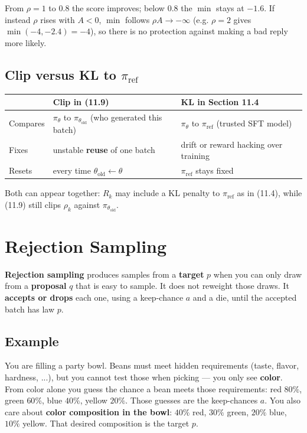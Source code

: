 From $\rho=1$ to $0.8$ the score improves; below $0.8$ the $\min$ stays at $-1.6$. If instead $\rho$ rises with $A<0$, $\min$ follows $\rho A\to-\infty$ (e.g. $\rho=2$ gives $\min(-4,-2.4)=-4$), so there is no protection against making a bad reply more likely.

\section{Clip versus KL to $\pi_{\mathrm{ref}}$}\label{app:G.3}

\begin{center}
\begin{tabular}{lll}
\toprule
 & Clip in (11.9) & KL in Section 11.4 \\
\midrule
Compares & $\pi_\theta$ to $\pi_{\theta_{\mathrm{old}}}$ (who generated this batch) & $\pi_\theta$ to $\pi_{\mathrm{ref}}$ (trusted SFT model) \\
Fixes & unstable \textbf{reuse} of one batch & drift or reward hacking over training \\
Resets & every time $\theta_{\mathrm{old}}\leftarrow\theta$ & $\pi_{\mathrm{ref}}$ stays fixed \\
\bottomrule
\end{tabular}
\end{center}

Both can appear together: $R_k$ may include a KL penalty to $\pi_{\mathrm{ref}}$ as in (11.4), while (11.9) still clips $\rho_k$ against $\pi_{\theta_{\mathrm{old}}}$.

\chapter{Rejection Sampling}\label{app:H}

\textbf{Rejection sampling} produces samples from a \textbf{target} $p$ when you can only draw from a \textbf{proposal} $q$ that is easy to sample. It does not reweight those draws. It \textbf{accepts or drops} each one, using a keep-chance $a$ and a die, until the accepted batch has law $p$.

\section{Example}

You are filling a party bowl. Beans must meet hidden requirements (taste, flavor, hardness, ...), but you cannot test those when picking --- you only see \textbf{color}. From color alone you guess the chance a bean meets those requirements: red $80\%$, green $60\%$, blue $40\%$, yellow $20\%$. Those guesses are the keep-chances $a$. You also care about \textbf{color composition in the bowl}: $40\%$ red, $30\%$ green, $20\%$ blue, $10\%$ yellow. That desired composition is the target $p$.

